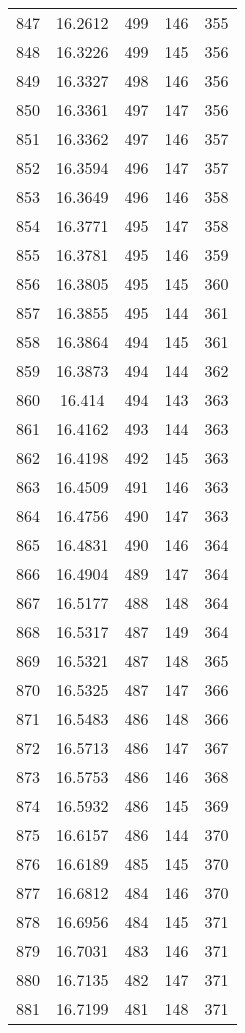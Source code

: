 \documentclass[12pt,a4paper]{article}
\begin{document}
\begin{tabular}{r|cccc}
	847 & 16.2612 & 499 & 146 & 355 \\
	848 & 16.3226 & 499 & 145 & 356 \\
	849 & 16.3327 & 498 & 146 & 356 \\
	850 & 16.3361 & 497 & 147 & 356 \\
	851 & 16.3362 & 497 & 146 & 357 \\
	852 & 16.3594 & 496 & 147 & 357 \\
	853 & 16.3649 & 496 & 146 & 358 \\
	854 & 16.3771 & 495 & 147 & 358 \\
	855 & 16.3781 & 495 & 146 & 359 \\
	856 & 16.3805 & 495 & 145 & 360 \\
	857 & 16.3855 & 495 & 144 & 361 \\
	858 & 16.3864 & 494 & 145 & 361 \\
	859 & 16.3873 & 494 & 144 & 362 \\
	860 & 16.414 & 494 & 143 & 363 \\
	861 & 16.4162 & 493 & 144 & 363 \\
	862 & 16.4198 & 492 & 145 & 363 \\
	863 & 16.4509 & 491 & 146 & 363 \\
	864 & 16.4756 & 490 & 147 & 363 \\
	865 & 16.4831 & 490 & 146 & 364 \\
	866 & 16.4904 & 489 & 147 & 364 \\
	867 & 16.5177 & 488 & 148 & 364 \\
	868 & 16.5317 & 487 & 149 & 364 \\
	869 & 16.5321 & 487 & 148 & 365 \\
	870 & 16.5325 & 487 & 147 & 366 \\
	871 & 16.5483 & 486 & 148 & 366 \\
	872 & 16.5713 & 486 & 147 & 367 \\
	873 & 16.5753 & 486 & 146 & 368 \\
	874 & 16.5932 & 486 & 145 & 369 \\
	875 & 16.6157 & 486 & 144 & 370 \\
	876 & 16.6189 & 485 & 145 & 370 \\
	877 & 16.6812 & 484 & 146 & 370 \\
	878 & 16.6956 & 484 & 145 & 371 \\
	879 & 16.7031 & 483 & 146 & 371 \\
	880 & 16.7135 & 482 & 147 & 371 \\
	881 & 16.7199 & 481 & 148 & 371 \\

\end{tabular}
\end{document}
